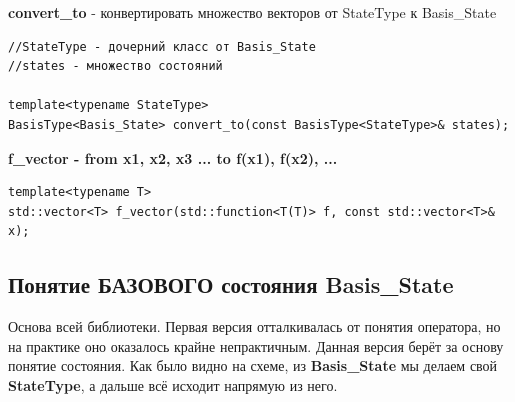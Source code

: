 \documentclass[12pt,fleqn]{article}
\begin{document}
\begin{center}{\textbf{convert\_to} - конвертировать множество векторов от StateType к Basis\_State}\end{center}
\begin{mdframed}[linecolor=black, topline=true, bottomline=true,
    leftline=false, rightline=false]
\begin{verbatim}
//StateType - дочерний класс от Basis_State
//states - множество состояний

template<typename StateType>
BasisType<Basis_State> convert_to(const BasisType<StateType>& states);
\end{verbatim}
\end{mdframed}

\begin{center}{\textbf{f\_vector - from {x1, x2, x3 ...} to {f(x1), f(x2), ...}}}\end{center}

\begin{mdframed}[linecolor=black, topline=true, bottomline=true,
    leftline=false, rightline=false]
\begin{verbatim}
template<typename T>
std::vector<T> f_vector(std::function<T(T)> f, const std::vector<T>& x);
\end{verbatim}
\end{mdframed}


        \subsection{Понятие БАЗОВОГО состояния \textbf{Basis\_State}}
        Основа всей библиотеки. Первая версия отталкивалась от понятия оператора, но на практике оно оказалось крайне непрактичным. Данная версия берёт за основу понятие состояния. 
        Как было видно на схеме, из \textbf{Basis\_State} мы делаем свой \textbf{StateType}, а дальше всё исходит напрямую из него.
\end{document}
